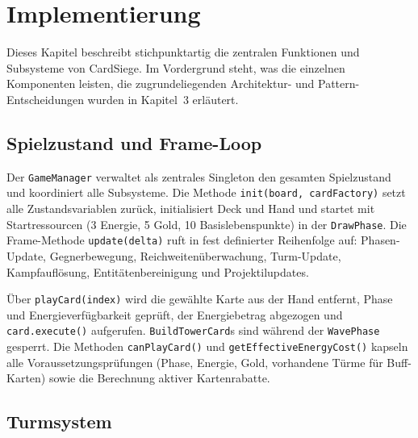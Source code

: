 \section{Implementierung}

Dieses Kapitel beschreibt stichpunktartig die zentralen Funktionen und Subsysteme
von CardSiege. Im Vordergrund steht, was die einzelnen Komponenten leisten, die
zugrundeliegenden Architektur- und Pattern-Entscheidungen wurden in Kapitel~3
erläutert.

\subsection{Spielzustand und Frame-Loop}

Der \texttt{GameManager} verwaltet als zentrales Singleton den gesamten
Spielzustand und koordiniert alle Subsysteme. Die Methode \texttt{init(board, cardFactory)}
setzt alle Zustandsvariablen zurück, initialisiert Deck und Hand und startet mit
Startressourcen (3 Energie, 5 Gold, 10 Basislebenspunkte) in der
\texttt{DrawPhase}. Die Frame-Methode \texttt{update(delta)} ruft in fest
definierter Reihenfolge auf: Phasen-Update, Gegnerbewegung,
Reichweitenüberwachung, Turm-Update, Kampfauflösung, Entitätenbereinigung und
Projektilupdates.

Über \texttt{playCard(index)} wird die gewählte Karte aus der Hand entfernt,
Phase und Energieverfügbarkeit geprüft, der Energiebetrag abgezogen und
\texttt{card.execute()} aufgerufen. \texttt{BuildTowerCard}s sind während der
\texttt{WavePhase} gesperrt. Die Methoden \texttt{canPlayCard()} und
\texttt{getEffective\-Energy\-Cost()} kapseln alle Voraussetzungsprüfungen
(Phase, Energie, Gold, vorhandene Türme für Buff-Karten) sowie die Berechnung
aktiver Kartenrabatte.

\subsection{Turmsystem}


